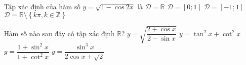\begin{ex}%
	Tập xác định của hàm số $y=\sqrt{1-\cos 2x}$ là
	\choice
	{\True $\mathscr{D}=\mathbb{R}$}
	{$\mathscr{D}=[0;1]$}
	{$\mathscr{D}=[-1;1]$}
	{$\mathscr{D}=\mathbb{R}\setminus\left\{k\pi, k\in\mathbb{Z}\right\}$}
\end{ex}
\begin{ex}%
	Hàm số nào sau đây có tập xác định $\mathbb{R}$?
	\choice
	{\True $y=\sqrt{\dfrac{2+\cos x}{2-\sin x}}$}
	{$y=\tan^2x+\cot^2x$}
	{$y=\dfrac{1+\sin^2x}{1+\cot^2x}$}
	{$y=\dfrac{\sin^3x}{2\cos x+\sqrt{2}}$}
\end{ex}
